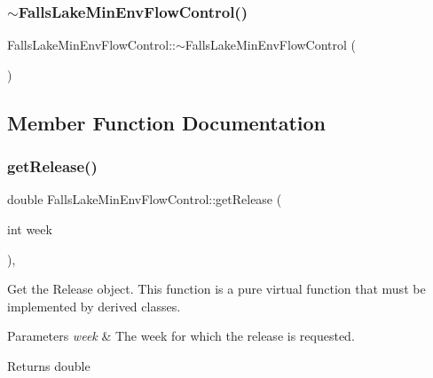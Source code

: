 \mbox{\label{classFallsLakeMinEnvFlowControl_a747aefedd1e590007206ef08145be351}} 
\subsubsection{\texorpdfstring{$\sim$\+Falls\+Lake\+Min\+Env\+Flow\+Control()}{~FallsLakeMinEnvFlowControl()}}
{\footnotesize\ttfamily Falls\+Lake\+Min\+Env\+Flow\+Control\+::$\sim$\+Falls\+Lake\+Min\+Env\+Flow\+Control (\begin{DoxyParamCaption}{ }\end{DoxyParamCaption})\hspace{0.3cm}{\ttfamily [override]}}



\subsection{Member Function Documentation}
\mbox{\label{classFallsLakeMinEnvFlowControl_a50453b443fb6e5869fcfc9a183f42b2f}} 
\subsubsection{\texorpdfstring{get\+Release()}{getRelease()}}
{\footnotesize\ttfamily double Falls\+Lake\+Min\+Env\+Flow\+Control\+::get\+Release (\begin{DoxyParamCaption}\item[{int}]{week }\end{DoxyParamCaption})\hspace{0.3cm}{\ttfamily [override]}, {\ttfamily [virtual]}}



Get the Release object. This function is a pure virtual function that must be implemented by derived classes. 


\begin{DoxyParams}{Parameters}
{\em week} & The week for which the release is requested.\\
\hline
\end{DoxyParams}
\begin{DoxyReturn}{Returns}
double 
\end{DoxyReturn}


